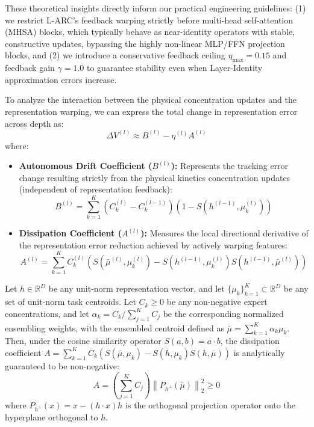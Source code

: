 These theoretical insights directly inform our practical engineering guidelines: (1) we restrict L-ARC's feedback warping strictly before multi-head self-attention (MHSA) blocks, which typically behave as near-identity operators with stable, constructive updates, bypassing the highly non-linear MLP/FFN projection blocks, and (2) we introduce a conservative feedback ceiling $\eta_{\max} = 0.15$ and feedback gain $\gamma = 1.0$ to guarantee stability even when Layer-Identity approximation errors increase.

To analyze the interaction between the physical concentration updates and the representation warping, we can express the total change in representation error across depth as:
\begin{equation}
\Delta V^{(l)} \approx B^{(l)} - \eta^{(l)} A^{(l)}
\label{eq:stability_total_change}
\end{equation}
where:
\begin{itemize}
    \item \textbf{Autonomous Drift Coefficient ($B^{(l)}$):} Represents the tracking error change resulting strictly from the physical kinetics concentration updates (independent of representation feedback):
    \begin{equation}
    B^{(l)} = \sum_{k=1}^K \left( C_k^{(l)} - C_k^{(l-1)} \right) \left( 1 - S(h^{(l-1)}, \mu_k^{(l)}) \right)
    \label{eq:coeff_B}
    \end{equation}
    \item \textbf{Dissipation Coefficient ($A^{(l)}$):} Measures the local directional derivative of the representation error reduction achieved by actively warping features:
    \begin{equation}
    A^{(l)} = \sum_{k=1}^K C_k^{(l)} \left( S(\bar{\mu}^{(l)}, \mu_k^{(l)}) - S(h^{(l-1)}, \mu_k^{(l)}) S(h^{(l-1)}, \bar{\mu}^{(l)}) \right)
    \label{eq:coeff_A}
    \end{equation}
\end{itemize}

\begin{theorem}
Let $h \in \mathbb{R}^D$ be any unit-norm representation vector, and let $\{\mu_k\}_{k=1}^K \subset \mathbb{R}^D$ be any set of unit-norm task centroids. Let $C_k \ge 0$ be any non-negative expert concentrations, and let $\alpha_k = C_k / \sum_{j=1}^K C_j$ be the corresponding normalized ensembling weights, with the ensembled centroid defined as $\bar{\mu} = \sum_{k=1}^K \alpha_k \mu_k$. Then, under the cosine similarity operator $S(a, b) = a \cdot b$, the dissipation coefficient $A = \sum_{k=1}^K C_k \left( S(\bar{\mu}, \mu_k) - S(h, \mu_k) S(h, \bar{\mu}) \right)$ is analytically guaranteed to be non-negative:
\begin{equation}
A = \left( \sum_{j=1}^K C_j \right) \left\| P_{h^\perp}(\bar{\mu}) \right\|_2^2 \ge 0
\end{equation}
where $P_{h^\perp}(x) = x - (h \cdot x) h$ is the orthogonal projection operator onto the hyperplane orthogonal to $h$.
\end{theorem}

